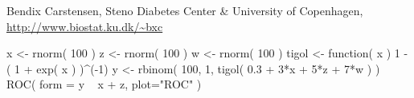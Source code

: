 \begin{Author}\relax
Bendix Carstensen, Steno Diabetes Center \& University of
Copenhagen,
\url{http://www.biostat.ku.dk/~bxc}
\end{Author}
\begin{References}\relax
\end{References}
\begin{Examples}
\begin{ExampleCode}
x <- rnorm( 100 )
z <- rnorm( 100 )
w <- rnorm( 100 )
tigol <- function( x ) 1 - ( 1 + exp( x ) )^(-1)
y <- rbinom( 100, 1, tigol( 0.3 + 3*x + 5*z + 7*w ) )
ROC( form = y ~ x + z, plot="ROC" )
\end{ExampleCode}
\end{Examples}

